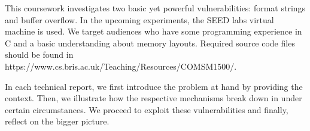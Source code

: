 This coursework investigates two basic yet powerful vulnerabilities: format strings and buffer overflow. In the upcoming experiments, the SEED labs virtual machine is used. We target audiences who have some programming experience in C and a basic understanding about memory layouts. Required source code files should be found in \\
https://www.cs.bris.ac.uk/Teaching/Resources/COMSM1500/.

In each technical report, we first introduce the problem at hand by providing the context. Then, we illustrate how the respective mechanisms break down in under certain circumstances. We proceed to exploit these vulnerabilities and finally, reflect on the bigger picture.